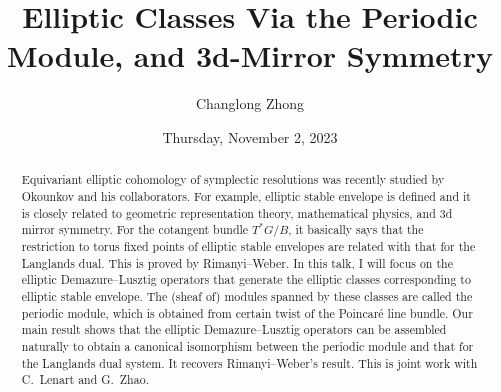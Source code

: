 \documentclass{UAmathtalk}
\author{Changlong Zhong}
\title{Elliptic Classes Via the Periodic Module, and 3d-Mirror Symmetry}
\date{Thursday, November 2, 2023}
\begin{document}
\maketitle

\begin{abstract}
Equivariant elliptic cohomology of symplectic resolutions was recently studied by Okounkov and his collaborators. For example, elliptic stable envelope is defined and it is closely related to geometric representation theory, mathematical physics, and 3d mirror symmetry. For the cotangent bundle $T^*G/B$, it basically says that the restriction to torus fixed points of elliptic stable envelopes are related with that for the Langlands dual. This is proved by Rimanyi--Weber. In this talk, I will focus on the elliptic Demazure--Lusztig operators that generate the elliptic classes corresponding to elliptic stable envelope. The (sheaf of) modules spanned by these classes are called the periodic module, which is obtained from certain twist of the Poincaré line bundle. Our main result shows that the elliptic Demazure--Lusztig operators can be assembled naturally to obtain a canonical isomorphism between the periodic module and that for the Langlands dual system. It recovers Rimanyi--Weber's result. This is joint work with C.~Lenart and G.~Zhao.
\end{abstract}
\end{document}
